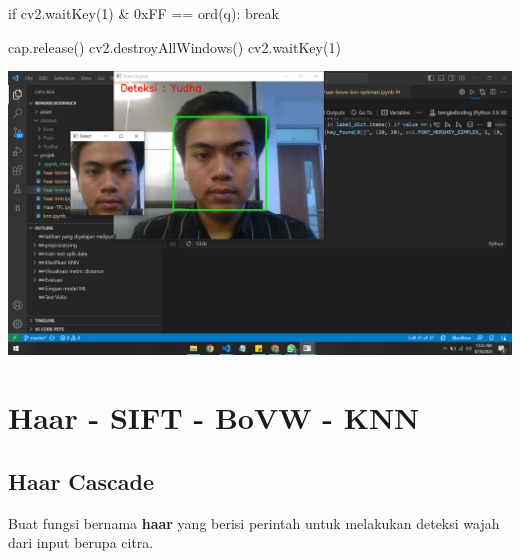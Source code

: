 \documentclass[
  letterpaper,
  DIV=11,
  numbers=noendperiod]{scrreprt}
\newenvironment{Shaded}{\begin{snugshade}}{\end{snugshade}}
\newcommand{\BaseNTok}[1]{\textcolor[rgb]{0.68,0.00,0.00}{#1}}
\newcommand{\BuiltInTok}[1]{\textcolor[rgb]{0.00,0.23,0.31}{#1}}
\newcommand{\ControlFlowTok}[1]{\textcolor[rgb]{0.00,0.23,0.31}{#1}}
\newcommand{\DecValTok}[1]{\textcolor[rgb]{0.68,0.00,0.00}{#1}}
\newcommand{\NormalTok}[1]{\textcolor[rgb]{0.00,0.23,0.31}{#1}}
\newcommand{\OperatorTok}[1]{\textcolor[rgb]{0.37,0.37,0.37}{#1}}
\newcommand{\StringTok}[1]{\textcolor[rgb]{0.13,0.47,0.30}{#1}}
\begin{document}
\begin{Shaded}
\begin{Highlighting}[]
    \ControlFlowTok{if}\NormalTok{ cv2.waitKey(}\DecValTok{1}\NormalTok{) }\OperatorTok{\&} \BaseNTok{0xFF} \OperatorTok{==} \BuiltInTok{ord}\NormalTok{(}\StringTok{\textquotesingle{}q\textquotesingle{}}\NormalTok{):}
        \ControlFlowTok{break}
    
\NormalTok{cap.release()}
\NormalTok{cv2.destroyAllWindows()}
\NormalTok{cv2.waitKey(}\DecValTok{1}\NormalTok{)}
\end{Highlighting}
\end{Shaded}

\includegraphics{Asset/testhaarknn.png}

\hypertarget{haar---sift---bovw---knn}{%
\section*{Haar - SIFT - BoVW - KNN}\label{haar---sift---bovw---knn}}


\hypertarget{haar-cascade-1}{%
\subsection*{Haar Cascade}\label{haar-cascade-1}}

Buat fungsi bernama \textbf{haar} yang berisi perintah untuk melakukan
deteksi wajah dari input berupa citra.
\end{document}
